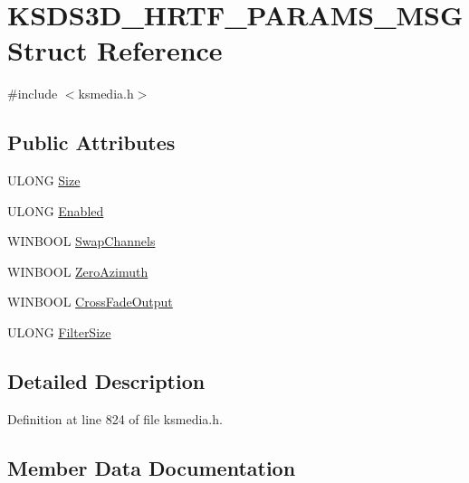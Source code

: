 \hypertarget{struct_k_s_d_s3_d___h_r_t_f___p_a_r_a_m_s___m_s_g}{}\section{K\+S\+D\+S3\+D\+\_\+\+H\+R\+T\+F\+\_\+\+P\+A\+R\+A\+M\+S\+\_\+\+M\+SG Struct Reference}
\label{struct_k_s_d_s3_d___h_r_t_f___p_a_r_a_m_s___m_s_g}


{\ttfamily \#include $<$ksmedia.\+h$>$}

\subsection*{Public Attributes}
\begin{DoxyCompactItemize}
\item 
U\+L\+O\+NG \hyperlink{struct_k_s_d_s3_d___h_r_t_f___p_a_r_a_m_s___m_s_g_afaad368c4b7ce7253a9ddf66aca64b59}{Size}
\item 
U\+L\+O\+NG \hyperlink{struct_k_s_d_s3_d___h_r_t_f___p_a_r_a_m_s___m_s_g_ab94cf1a71d9a101c1bf2e5b0cfe6c580}{Enabled}
\item 
W\+I\+N\+B\+O\+OL \hyperlink{struct_k_s_d_s3_d___h_r_t_f___p_a_r_a_m_s___m_s_g_acd42ec8fc2bc07307ccb971ed94ceded}{Swap\+Channels}
\item 
W\+I\+N\+B\+O\+OL \hyperlink{struct_k_s_d_s3_d___h_r_t_f___p_a_r_a_m_s___m_s_g_a459cb9409a292b91ca43d9f719f9538d}{Zero\+Azimuth}
\item 
W\+I\+N\+B\+O\+OL \hyperlink{struct_k_s_d_s3_d___h_r_t_f___p_a_r_a_m_s___m_s_g_aa7a6adaee0ef3b1d5d509eb72c11bb55}{Cross\+Fade\+Output}
\item 
U\+L\+O\+NG \hyperlink{struct_k_s_d_s3_d___h_r_t_f___p_a_r_a_m_s___m_s_g_a80cd979deddb1285ba7775aade4fd4dc}{Filter\+Size}
\end{DoxyCompactItemize}


\subsection{Detailed Description}


Definition at line 824 of file ksmedia.\+h.



\subsection{Member Data Documentation}
